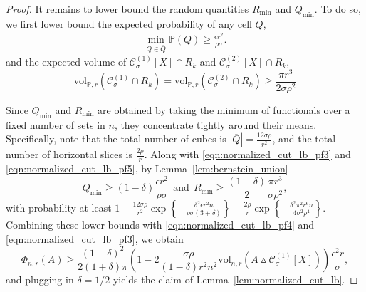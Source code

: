 \documentclass[11pt,twoside]{article}
\newcommand{\set}[1]{\left\{#1\right\}}
\newcommand{\vol}{\mathrm{vol}}
\newcommand{\abs}[1]{\left \lvert #1 \right \rvert}
\newcommand{\1}{\mathbf{1}}
\newcommand{\Xbf}{X}             %
\newcommand{\Pbb}{\mathbb{P}}
\begin{document}
\begin{proof}
	It remains to lower bound the random quantities $R_{\min}$ and $Q_{\min}$.
	To do so, we first lower bound the expected probability of any cell $Q$,
	\begin{align*}
	\min_{Q \in \overline{Q}} \Pbb(Q) \geq \frac{\epsilon r^2}{\rho \sigma}.
	\end{align*}
	and the expected volume of $\mathcal{C}_{\sigma}^{(1)}[\Xbf] \cap R_k$ and $\mathcal{C}_{\sigma}^{(2)}[\Xbf] \cap R_k$,
	\begin{equation}
	\vol_{\Pbb,r}(\mathcal{C}_{\sigma}^{(1)} \cap R_k) = \vol_{\Pbb,r}(\mathcal{C}_{\sigma}^{(2)} \cap R_k) \geq \frac{\pi r^3}{2 \sigma \rho^2} \label{eqn:normalized_cut_lb_pf5}
	\end{equation}
	
	Since $Q_{\min}$ and $R_{\min}$ are obtained by taking the minimum of functionals over a fixed number of sets in $n$, they concentrate tightly around their means. Specifically, note that the total number of cubes is $\abs{\overline{Q}} = \frac{12 \sigma \rho}{r^2}$, and the total number of horizontal slices is $\frac{2\rho}{r}$. Along with \eqref{eqn:normalized_cut_lb_pf3} and \eqref{eqn:normalized_cut_lb_pf5}, by Lemma~\ref{lem:bernstein_union} 
	\begin{equation*}
	Q_{\min} \geq (1 - \delta)\frac{\epsilon r^2}{\rho \sigma} ~~\textrm{and}~~ R_{\min} \geq \frac{(1 - \delta)}{2}\frac{\pi r^3}{\sigma \rho^2 },
	\end{equation*}
	with probability at least $1 - \frac{12\sigma \rho}{r^2} \exp\set{-\frac{\delta^2\epsilon r^2 n}{\rho \sigma(3 + \delta)}} - \frac{2\rho}{r}\exp\set{-\frac{\delta^2\pi^2 r^6n}{4\sigma^2\rho^4}}$. Combining these lower bounds with \eqref{eqn:normalized_cut_lb_pf4} and \eqref{eqn:normalized_cut_lb_pf3}, we obtain
	\begin{equation*}	
	\Phi_{n,r}(A) \geq \frac{(1 - \delta)^2}{2(1 + \delta)\pi} \left(1 - 2 \frac{\sigma \rho}{(1 - \delta) r^2 n^2} \vol_{n,r}(A \vartriangle \mathcal{C}_{\sigma}^{(1)}[\Xbf]) \right) \frac{\epsilon^2 r}{\sigma},
	\end{equation*}
	and plugging in $\delta = 1/2$ yields the claim of Lemma~\ref{lem:normalized_cut_lb}.
\end{proof}
\end{document}
